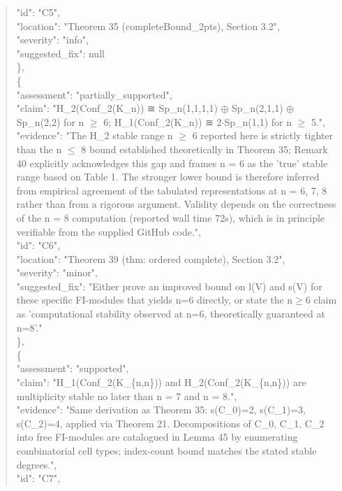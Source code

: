 \documentclass[11pt]{article}
\begin{document}
\begin{quote}
      "id": "C5",\\
      "location": "Theorem 35 (completeBound\_2pts), Section 3.2",\\
      "severity": "info",\\
      "suggested\_fix": null\\
    \},\\
    \{\\
      "assessment": "partially\_supported",\\
      "claim": "H\_2(Conf\_2(K\_n)) ≅ Sp\_n(1,1,1,1) \ensuremath{\oplus} Sp\_n(2,1,1) \ensuremath{\oplus} Sp\_n(2,2) for n \ensuremath{\ge} 6; H\_1(Conf\_2(K\_n)) ≅ 2\ensuremath{\cdot}Sp\_n(1,1) for n \ensuremath{\ge} 5.",\\
      "evidence": "The H\_2 stable range n \ensuremath{\ge} 6 reported here is strictly tighter than the n \ensuremath{\le} 8 bound established theoretically in Theorem 35; Remark 40 explicitly acknowledges this gap and frames n = 6 as the 'true' stable range based on Table 1. The stronger lower bound is therefore inferred from empirical agreement of the tabulated representations at n = 6, 7, 8 rather than from a rigorous argument. Validity depends on the correctness of the n = 8 computation (reported wall time 72s), which is in principle verifiable from the supplied GitHub code.",\\
      "id": "C6",\\
      "location": "Theorem 39 (thm: ordered complete), Section 3.2",\\
      "severity": "minor",\\
      "suggested\_fix": "Either prove an improved bound on l(V) and s(V) for these specific FI-modules that yields n=6 directly, or state the n\ensuremath{\ge}6 claim as 'computational stability observed at n=6, theoretically guaranteed at n=8'."\\
    \},\\
    \{\\
      "assessment": "supported",\\
      "claim": "H\_1(Conf\_2(K\_\{n,n\})) and H\_2(Conf\_2(K\_\{n,n\})) are multiplicity stable no later than n = 7 and n = 8.",\\
      "evidence": "Same derivation as Theorem 35: s(C\_0)=2, s(C\_1)=3, s(C\_2)=4, applied via Theorem 21. Decompositions of C\_0, C\_1, C\_2 into free FI-modules are catalogued in Lemma 45 by enumerating combinatorial cell types; index-count bound matches the stated stable degrees.",\\
      "id": "C7",\\

\end{quote}
\end{document}
